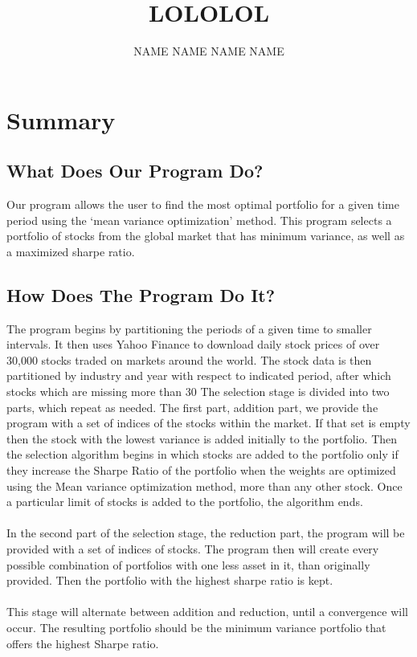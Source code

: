 \documentclass[12pt]{article}
\title{LOLOLOL}
\author{NAME NAME NAME NAME}
\begin{document}
\section{Summary}
\subsection{What Does Our Program Do?}
Our program allows the user to find the most optimal portfolio for a given time period using the ‘mean variance optimization’ method. This program selects a portfolio of stocks from the global market that has minimum variance, as well as a maximized sharpe ratio.

\subsection{How Does The Program Do It?}
The program begins by partitioning the periods of a given time to smaller intervals. It then uses Yahoo Finance to download daily stock prices of over 30,000 stocks traded on markets around the world. The stock data is then partitioned by industry and year with respect to indicated period, after which stocks which are missing more than 30%
The selection stage is divided into two parts, which repeat as needed. The first part, addition part, we provide the program with a set of indices of the stocks within the market. If that set is empty then the stock with the lowest variance is added initially to the portfolio. Then the selection algorithm begins in which stocks are added to the portfolio only if they increase the Sharpe Ratio of the portfolio when the weights are optimized using the Mean variance optimization method, more than any other stock. Once a particular limit of stocks is added to the portfolio, the algorithm ends. \\ \\
In the second part of the selection stage, the reduction part, the program will be provided with a set of indices of stocks. The program then will create every possible combination of portfolios with one less asset in it, than originally provided. Then the portfolio with the highest sharpe ratio is kept.  \\ \\ 
This stage will alternate between addition and reduction, until a convergence will occur. The resulting portfolio should be the minimum variance portfolio that offers the highest Sharpe ratio. 
\end{document}
